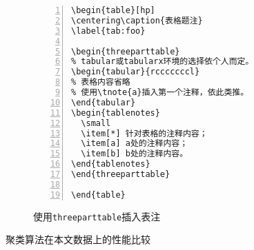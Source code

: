 \begin{figure}[h]
  {
  \fontsize{10pt}{12pt}\selectfont
  \setmainfont{Courier New}
  \begin{lstlisting}[showstringspaces=false,numbers=left,xleftmargin=3em]
\begin{table}[hp]
\centering\caption{表格题注}
\label{tab:foo}

\begin{threeparttable}
% tabular或tabularx环境的选择依个人而定。
\begin{tabular}{rcccccccl}
% 表格内容省略
% 使用\tnote{a}插入第一个注释，依此类推。
\end{tabular}
\begin{tablenotes}
  \small
  \item[*] 针对表格的注释内容；
  \item[a] a处的注释内容；
  \item[b] b处的注释内容。
\end{tablenotes}
\end{threeparttable}

\end{table}
  \end{lstlisting}
  }
\caption{使用\texttt{threeparttable}插入表注}
\label{fig:tpt}
\end{figure}

\begin{table}[hp]
\centering
\caption{聚类算法在本文数据上的性能比较}
\label{tab:algo_compare}

\end{table}
